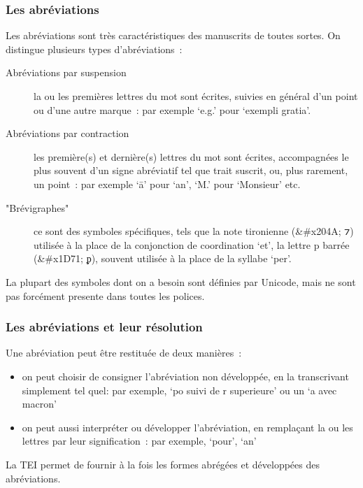 \documentclass[]{beamer}\makeatletter
\begin{document}
\begin{frame}
\frametitle{Les abréviations}\par
Les abréviations sont très caractéristiques des manuscrits de toutes      sortes. On distingue plusieurs types d’abréviations :       \begin{description}

\item[Abréviations par suspension]la ou les premières lettres du mot sont écrites, suivies en        général d’un point ou d’une autre marque : par exemple ‘e.g.’        pour ‘exempli gratia’. 
\item[Abréviations par contraction]les première(s) et dernière(s) lettres du mot sont écrites,        accompagnées le plus souvent d’un signe abréviatif tel que trait        suscrit, ou, plus rarement, un point : par exemple ‘ā’ pour        ‘an’, ‘M.’ pour         ‘Monsieur’ etc. 
\item["Brévigraphes"]ce sont des symboles spécifiques, tels que la note tironienne        (&#x204A; ⁊) utilisée à la place de la conjonction de coordination         ‘et’, la lettre p barrée (&#x1D71; ᵱ), souvent utilisée à        la place de la syllabe ‘per’. 
\end{description}      \par
La plupart des symboles dont on a besoin sont définies par Unicode, mais ne sont pas forcément presente dans toutes les polices.
\end{frame}

\begin{frame}
\frametitle{Les abréviations et leur résolution}\par
Une abréviation peut être restituée de deux manières : \begin{itemize}

\item on peut choisir de consigner l’abréviation non développée, en        la transcrivant simplement tel quel: par exemple, ‘po suivi de r        superieure’ ou un ‘a avec macron’
\item on peut aussi interpréter ou développer l’abréviation, en        remplaçant la ou les lettres par leur signification : par exemple,        ‘pour’, ‘an’
\end{itemize}      \par
La TEI permet de fournir à la fois les formes abrégées et développées      des abréviations.
\end{frame}
\end{document}
